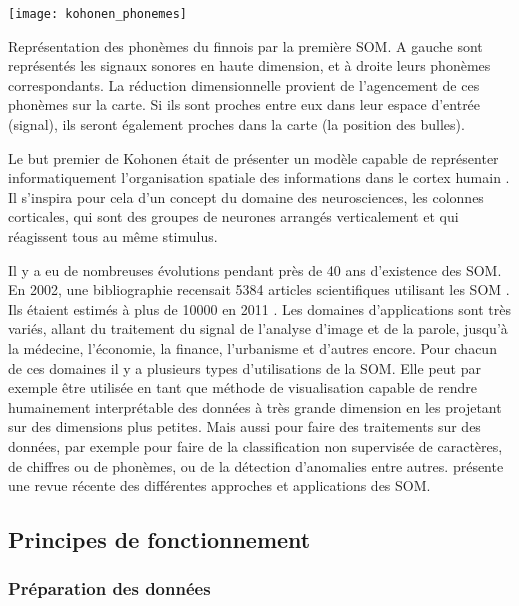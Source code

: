 	\begin{figureth}
		\texttt{[image: kohonen\_phonemes]}
		\caption[Phonème SOM]{Représentation des phonèmes du finnois par la première SOM. A gauche sont représentés les signaux sonores en haute dimension, et à droite leurs phonèmes correspondants. La réduction dimensionnelle provient de l'agencement de ces phonèmes sur la carte. Si ils sont proches entre eux dans leur espace d'entrée (signal), ils seront également proches dans la carte (la position des bulles)\footnotemark .}\label{fig:img:phonemes}

	\end{figureth}


	Le but premier de Kohonen était de présenter un modèle capable de représenter informatiquement l'organisation spatiale des informations dans le cortex humain \cite{kohonen-memory}. Il s'inspira pour cela d'un concept du domaine des neurosciences, les colonnes corticales, qui sont des groupes de neurones arrangés verticalement et qui réagissent tous au même stimulus.

	Il y a eu de nombreuses évolutions pendant près de 40 ans d'existence des SOM. En 2002, une bibliographie recensait 5384 articles scientifiques utilisant les SOM \cite{oja2003bibliography}. Ils étaient estimés à plus de 10000 en 2011 \cite{bilbiography-finuni}. Les domaines d'applications sont très variés, allant du traitement du signal de l'analyse d'image et de la parole, jusqu'à la médecine, l'économie, la finance, l'urbanisme et d'autres encore. Pour chacun de ces domaines il y a plusieurs types d'utilisations de la SOM. Elle peut par exemple être utilisée en tant que méthode de visualisation capable de rendre humainement interprétable des données à très grande dimension en les projetant sur des dimensions plus petites. Mais aussi pour faire des traitements sur des données, par exemple pour faire de la classification non supervisée de caractères, de chiffres ou de phonèmes, ou de la détection d'anomalies entre autres. \cite{cottrell2018self} présente une revue récente des différentes approches et applications des SOM. 

\subsection{Principes de fonctionnement}
\subsubsection{Préparation des données}

